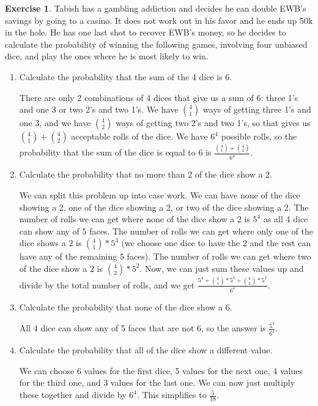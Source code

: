 \documentclass[12pt]{amsart}
\theoremstyle{definition}
\newtheorem{exercise}{Exercise}
\numberwithin{equation}{section}
\theoremstyle{plain}
\begin{document}
 
\begin{exercise}
Tabish has a gambling addiction and decides he can double EWB's savings by going to a casino. It does not work out in his favor and he ends up 50k in the hole. He has one last shot to recover EWB's money, so he decides to calculate the probability of winning the following games, involving four unbiased dice, and play the ones where he is most likely to win.
\begin{enumerate}[label=\Alph*.)]
\item Calculate the probability that the sum of the 4 dice is 6. 
\begin{answer}There are only 2 combinations of 4 dices that give us a sum of 6: three 1's and one 3 or two 2's and two 1's. We have $\binom{4}{1}$ ways of getting three 1's and one 3, and we have $\binom{4}{2}$ ways of getting two 2's and two 1's, so that gives us $\binom{4}{1}+\binom{4}{2}$ acceptable rolls of the dice. We have $6^4$ possible rolls, so the probability that the sum of the dice is equal to 6 is $\frac{\binom{4}{1}+\binom{4}{2}}{6^4}$.
\end{answer}
\item Calculate the probability that no more than 2 of the dice show a 2. 
\begin{answer}We can split this problem up into case work. We can have none of the dice showing a 2, one of the dice showing a 2, or two of the dice showing a 2. The number of rolls we can get where none of the dice show a 2 is $5^4$ as all 4 dice can show any of 5 faces. The number of rolls we can get where only one of the dice shows a 2 is $\binom{4}{1}*5^3$ (we choose one dice to have the 2 and the rest can have any of the remaining 5 faces). The number of rolls we can get where two of the dice show a 2 is $\binom{4}{2}*5^2$. Now, we can just sum these values up and divide by the total number of rolls, and we get $\frac{5^4 + \binom{4}{1}*5^3 + \binom{4}{2}*5^2}{6^4}$.
\end{answer}
\item Calculate the probability that none of the dice show a 6.
\begin{answer}
All 4 dice can show any of 5 faces that are not 6, so the answer is $\frac{5^4}{6^4}$.
\end{answer}
\item Calculate the probability that all of the dice show a different value.
\begin{answer}
We can choose 6 values for the first dice, 5 values for the next one, 4 values for the third one, and 3 values for the last one. We can now just multiply these together and divide by $6^4$. This simplifies to $\frac{5}{18}$.

\end{answer}
\end{enumerate}
\end{exercise}
\end{document}
